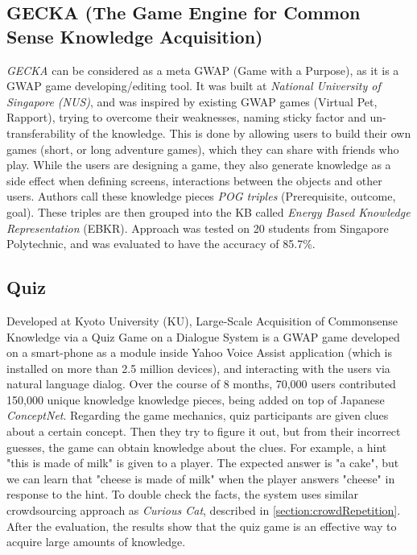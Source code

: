 \subsection{GECKA (The Game Engine for Common Sense Knowledge Acquisition)}
\label{section:r:gecka}
\emph{GECKA} can be considered as a meta GWAP (Game with a Purpose), as it is
a GWAP game developing/editing tool. It was built at \emph{National University 
of Singapore (NUS)}, and was inspired by existing GWAP games
(Virtual Pet, Rapport), trying to overcome their weaknesses, naming sticky 
factor and un-transferability of the knowledge. This is done by allowing
users to build their own games (short, or long adventure games), which they can
share with friends who play. While the users are designing a game, they
also generate knowledge as a side effect when defining screens, interactions
between the objects and other users. Authors call these knowledge pieces
\emph{POG triples} (Prerequisite, outcome, goal). These triples are then 
grouped into the KB called \emph{Energy Based Knowledge Representation} (EBKR).
Approach was tested on 20 students from Singapore Polytechnic, and was evaluated
to have the accuracy of  85.7\%.

\subsection{Quiz}
\label{section:r:qiz}
Developed at Kyoto University (KU), Large-Scale Acquisition of Commonsense 
Knowledge via a Quiz Game on a
Dialogue System \parencite{Otani2016} is a GWAP game developed on a 
smart-phone as a module inside Yahoo Voice Assist application (which is 
installed on more than 2.5 million devices), and interacting with the users 
via natural language dialog.  Over the course of 8 months, 70,000
users contributed 150,000 unique knowledge knowledge pieces, being added on
top of Japanese \emph{ConceptNet}. Regarding the game mechanics,
quiz participants are given clues about a certain concept. Then they try to
figure it out, but from their incorrect guesses, the game can obtain knowledge 
about the clues. For example, a hint "this is made of milk" is given to a 
player. The expected answer is "a cake", but we can learn that "cheese is made 
of milk" when the player answers "cheese" in response to the hint.
To double check the facts, the system uses similar crowdsourcing approach as 
\emph{Curious Cat}, described in \autoref{section:crowdRepetition}. After
the evaluation, the results show that the quiz game is an effective way
to acquire large amounts of knowledge.

